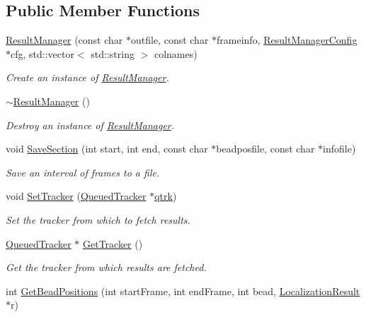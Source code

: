 \subsection*{Public Member Functions}
\begin{DoxyCompactItemize}
\item 
\hyperlink{class_result_manager_a44c51e60829a40eb9d12d50dd7157cff}{Result\+Manager} (const char $\ast$outfile, const char $\ast$frameinfo, \hyperlink{struct_result_manager_config}{Result\+Manager\+Config} $\ast$cfg, std\+::vector$<$ std\+::string $>$ colnames)
\begin{DoxyCompactList}\small\item\em Create an instance of \hyperlink{class_result_manager}{Result\+Manager}. \end{DoxyCompactList}\item 
\hyperlink{class_result_manager_ab74fc12f867b0e890d2aec3e0a935293}{$\sim$\+Result\+Manager} ()
\begin{DoxyCompactList}\small\item\em Destroy an instance of \hyperlink{class_result_manager}{Result\+Manager}. \end{DoxyCompactList}\item 
void \hyperlink{class_result_manager_ab744ccc8dd33fc3b1880bd24e3981fcc}{Save\+Section} (int start, int end, const char $\ast$beadposfile, const char $\ast$infofile)
\begin{DoxyCompactList}\small\item\em Save an interval of frames to a file. \end{DoxyCompactList}\item 
void \hyperlink{class_result_manager_a415bd4a67729b4347866be136dd413b5}{Set\+Tracker} (\hyperlink{class_queued_tracker}{Queued\+Tracker} $\ast$\hyperlink{class_result_manager_a782d776e818e9be737c418d2151402ed}{qtrk})
\begin{DoxyCompactList}\small\item\em Set the tracker from which to fetch results. \end{DoxyCompactList}\item 
\hyperlink{class_queued_tracker}{Queued\+Tracker} $\ast$ \hyperlink{class_result_manager_aafc624688ed2b4ef158299935ba3f043}{Get\+Tracker} ()
\begin{DoxyCompactList}\small\item\em Get the tracker from which results are fetched. \end{DoxyCompactList}\item 
int \hyperlink{class_result_manager_aa258efc5ddd5e737fd6a00bf3372dd81}{Get\+Bead\+Positions} (int start\+Frame, int end\+Frame, int bead, \hyperlink{struct_localization_result}{Localization\+Result} $\ast$r)

\end{DoxyCompactItemize}
